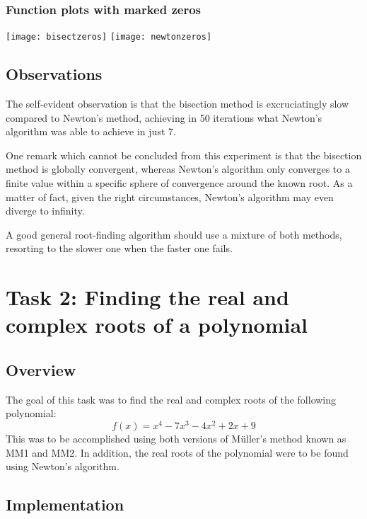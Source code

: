 \documentclass{article}
\begin{document}
	\subsubsection{Function plots with marked zeros}
	
	\texttt{[image: bisectzeros]}
	\texttt{[image: newtonzeros]}
	
	\subsection{Observations}
	
	The self-evident observation is that the bisection method is excruciatingly
	slow compared to Newton's method, achieving in 50 iterations what Newton's
	algorithm was able to achieve in just 7.

	One remark which cannot be concluded from this experiment is that the
	bisection method is globally convergent, whereas Newton's algorithm only
	converges to a finite value within a specific sphere of convergence around
	the known root. As a matter of fact, given the right circumstances, Newton's
	algorithm may even diverge to infinity.
	
	A good general root-finding algorithm should use a mixture of both methods,
	resorting to the slower one when the faster one fails.
	
	\newpage
	
	\section{Task 2: Finding the real and complex roots of a polynomial}
	
	\subsection{Overview}
	
	The goal of this task was to find the real and complex roots of the
	following polynomial:
	\begin{equation*}
		f(x) = x^4 - 7 x^3 - 4 x^2 + 2 x + 9
	\end{equation*}
	This was to be accomplished using both versions of M{\"u}ller's method
	known as MM1 and MM2. In addition, the real roots of the polynomial were to
	be found using Newton's	algorithm.
	
	\subsection{Implementation}
	
\end{document}
